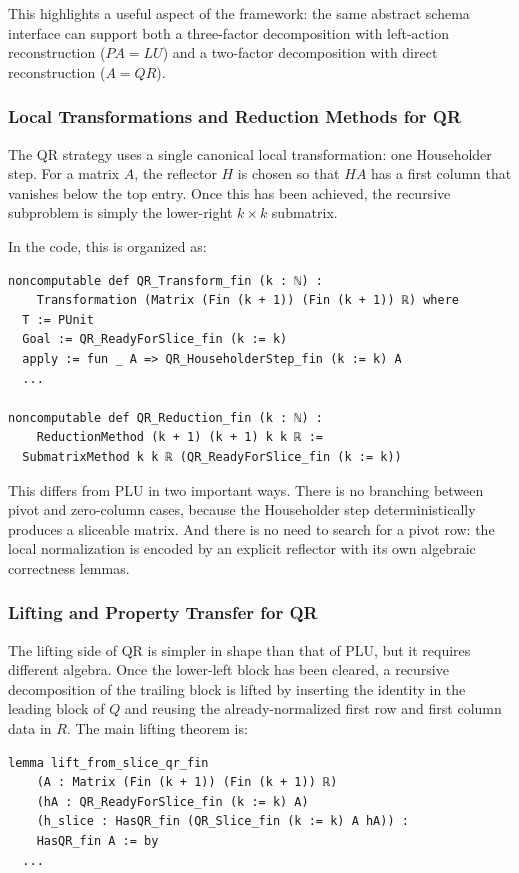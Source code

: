 \documentclass[pdflatex,sn-mathphys-num]{sn-jnl}%
\theoremstyle{thmstyleone}%
\theoremstyle{thmstyletwo}%
\theoremstyle{thmstylethree}%
\begin{document}
This highlights a useful aspect of the framework: the same abstract schema interface can support both a three-factor decomposition with left-action reconstruction (\(P A = L U\)) and a two-factor decomposition with direct reconstruction (\(A = Q R\)).

\subsubsection{Local Transformations and Reduction Methods for QR}
The QR strategy uses a single canonical local transformation: one Householder step.  For a matrix \(A\), the reflector \(H\) is chosen so that \(H A\) has a first column that vanishes below the top entry.  Once this has been achieved, the recursive subproblem is simply the lower-right \(k\times k\) submatrix.

In the code, this is organized as:

\begin{lstlisting}
noncomputable def QR_Transform_fin (k : ℕ) :
    Transformation (Matrix (Fin (k + 1)) (Fin (k + 1)) ℝ) where
  T := PUnit
  Goal := QR_ReadyForSlice_fin (k := k)
  apply := fun _ A => QR_HouseholderStep_fin (k := k) A
  ...

noncomputable def QR_Reduction_fin (k : ℕ) :
    ReductionMethod (k + 1) (k + 1) k k ℝ :=
  SubmatrixMethod k k ℝ (QR_ReadyForSlice_fin (k := k))
\end{lstlisting}

This differs from PLU in two important ways.  There is no branching between pivot and zero-column cases, because the Householder step deterministically produces a sliceable matrix.  And there is no need to search for a pivot row: the local normalization is encoded by an explicit reflector with its own algebraic correctness lemmas.

\subsubsection{Lifting and Property Transfer for QR}
The lifting side of QR is simpler in shape than that of PLU, but it requires different algebra.  Once the lower-left block has been cleared, a recursive decomposition of the trailing block is lifted by inserting the identity in the leading block of \(Q\) and reusing the already-normalized first row and first column data in \(R\).  The main lifting theorem is:

\begin{lstlisting}
lemma lift_from_slice_qr_fin
    (A : Matrix (Fin (k + 1)) (Fin (k + 1)) ℝ)
    (hA : QR_ReadyForSlice_fin (k := k) A)
    (h_slice : HasQR_fin (QR_Slice_fin (k := k) A hA)) :
    HasQR_fin A := by
  ...
\end{lstlisting}
\end{document}
